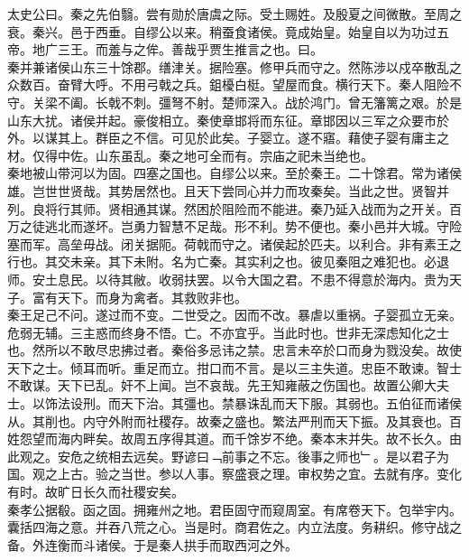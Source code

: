 \documentclass{zhvt-classic}
\begin{document}
\hspace*{2em}太史公曰。秦之先伯翳。尝有勋於唐虞之际。受土赐姓。及殷夏之间微散。至周之衰。秦兴。邑于西垂。自缪公以来。稍蚕食诸侯。竟成始皇。始皇自以为功过五帝。地广三王。而羞与之侔。善哉乎贾生推言之也。曰。\\
\hspace*{2em}秦并兼诸侯山东三十馀郡。缮津关。据险塞。修甲兵而守之。然陈涉以戍卒散乱之众数百。奋臂大呼。不用弓戟之兵。鉏櫌白梃。望屋而食。横行天下。秦人阻险不守。关梁不阖。长戟不刺。彊弩不射。楚师深入。战於鸿门。曾无籓篱之艰。於是山东大扰。诸侯并起。豪俊相立。秦使章邯将而东征。章邯因以三军之众要市於外。以谋其上。群臣之不信。可见於此矣。子婴立。遂不寤。藉使子婴有庸主之材。仅得中佐。山东虽乱。秦之地可全而有。宗庙之祀未当绝也。\\
\hspace*{2em}秦地被山带河以为固。四塞之国也。自缪公以来。至於秦王。二十馀君。常为诸侯雄。岂世世贤哉。其势居然也。且天下尝同心并力而攻秦矣。当此之世。贤智并列。良将行其师。贤相通其谋。然困於阻险而不能进。秦乃延入战而为之开关。百万之徒逃北而遂坏。岂勇力智慧不足哉。形不利。势不便也。秦小邑并大城。守险塞而军。高垒毋战。闭关据阨。荷戟而守之。诸侯起於匹夫。以利合。非有素王之行也。其交未亲。其下未附。名为亡秦。其实利之也。彼见秦阻之难犯也。必退师。安土息民。以待其敝。收弱扶罢。以令大国之君。不患不得意於海内。贵为天子。富有天下。而身为禽者。其救败非也。\\
\hspace*{2em}秦王足己不问。遂过而不变。二世受之。因而不改。暴虐以重祸。子婴孤立无亲。危弱无辅。三主惑而终身不悟。亡。不亦宜乎。当此时也。世非无深虑知化之士也。然所以不敢尽忠拂过者。秦俗多忌讳之禁。忠言未卒於口而身为戮没矣。故使天下之士。倾耳而听。重足而立。拑口而不言。是以三主失道。忠臣不敢谏。智士不敢谋。天下已乱。奸不上闻。岂不哀哉。先王知雍蔽之伤国也。故置公卿大夫士。以饰法设刑。而天下治。其彊也。禁暴诛乱而天下服。其弱也。五伯征而诸侯从。其削也。内守外附而社稷存。故秦之盛也。繁法严刑而天下振。及其衰也。百姓怨望而海内畔矣。故周五序得其道。而千馀岁不绝。秦本末并失。故不长久。由此观之。安危之统相去远矣。野谚曰﹁前事之不忘。後事之师也﹂。是以君子为国。观之上古。验之当世。参以人事。察盛衰之理。审权势之宜。去就有序。变化有时。故旷日长久而社稷安矣。\\
\hspace*{2em}秦孝公据殽。函之固。拥雍州之地。君臣固守而窥周室。有席卷天下。包举宇内。囊括四海之意。并吞八荒之心。当是时。商君佐之。内立法度。务耕织。修守战之备。外连衡而斗诸侯。于是秦人拱手而取西河之外。\\
\end{document}
